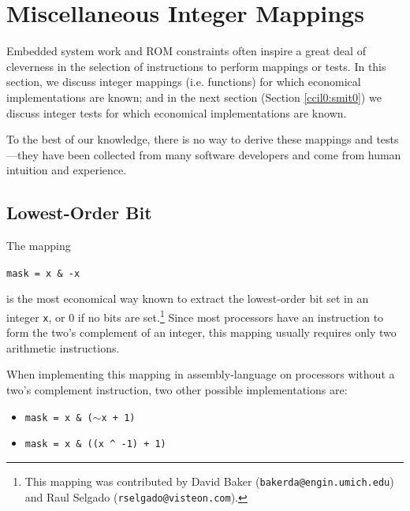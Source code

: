 \section{Miscellaneous Integer Mappings}
\label{ccil0:smim0}

Embedded system work and ROM constraints often inspire a great deal
of cleverness in the selection of instructions to perform mappings or
tests.  In this section, we discuss integer mappings (i.e. functions)
for which economical implementations are known; and in the next section
(Section \ref{ccil0:smit0})
we discuss integer tests for which economical implementations are known.

To the best of our knowledge, there is no way to derive these mappings
and tests---they have been collected from many software developers and
come from human intuition and experience.


\subsection{Lowest-Order Bit}
\label{ccil0:smim0:slib0}


The mapping

\texttt{mask = x \& -x}

\noindent{}is the most economical way known to extract the 
lowest-order bit set in an integer \texttt{x}, or 
0 if no bits are set.\footnote{This mapping was contributed by 
David Baker (\texttt{bakerda@engin.umich.edu}) 
and Raul Selgado (\texttt{rselgado@visteon.com}).}  Since most processors have an instruction to form the
two's complement of an integer, this mapping usually requires only
two arithmetic instructions.

When implementing this mapping in assembly-language on processors without a
two's complement instruction, two other possible implementations are:

\begin{itemize}
\item \texttt{mask = x \& ($\sim$x + 1)}
\item \texttt{mask = x \& ((x \^{ } -1) + 1)}
\end{itemize}


